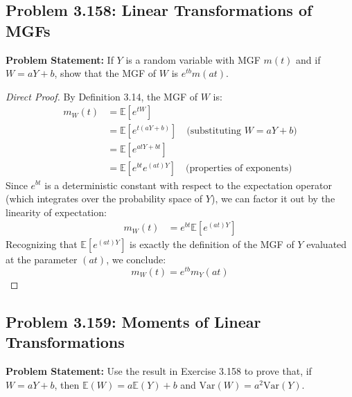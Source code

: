 \documentclass[11pt, a4paper]{article}
\theoremstyle{definition}
\theoremstyle{remark}
\newcommand{\E}{\mathbb{E}}
\newcommand{\Var}{\mathrm{Var}}
\begin{document}
\subsection{Problem 3.158: Linear Transformations of MGFs}
\textbf{Problem Statement:} If $Y$ is a random variable with MGF $m(t)$ and if $W = aY + b$, show that the MGF of $W$ is $e^{tb}m(at)$.

\begin{proof}[Direct Proof]
By Definition 3.14, the MGF of $W$ is:
\begin{align*}
    m_W(t) &= \E[e^{tW}] \\
           &= \E[e^{t(aY + b)}] \quad \text{(substituting } W = aY + b \text{)} \\
           &= \E[e^{atY + bt}] \\
           &= \E[e^{bt} e^{(at)Y}] \quad \text{(properties of exponents)}
\end{align*}
Since $e^{bt}$ is a deterministic constant with respect to the expectation operator (which integrates over the probability space of $Y$), we can factor it out by the linearity of expectation:
\begin{align*}
    m_W(t) &= e^{bt} \E[e^{(at)Y}]
\end{align*}
Recognizing that $\E[e^{(at)Y}]$ is exactly the definition of the MGF of $Y$ evaluated at the parameter $(at)$, we conclude:
\[ m_W(t) = e^{tb} m_Y(at) \]
\end{proof}

\subsection{Problem 3.159: Moments of Linear Transformations}
\textbf{Problem Statement:} Use the result in Exercise 3.158 to prove that, if $W = aY + b$, then $\E(W) = a\E(Y) + b$ and $\Var(W) = a^2\Var(Y)$.
\end{document}
